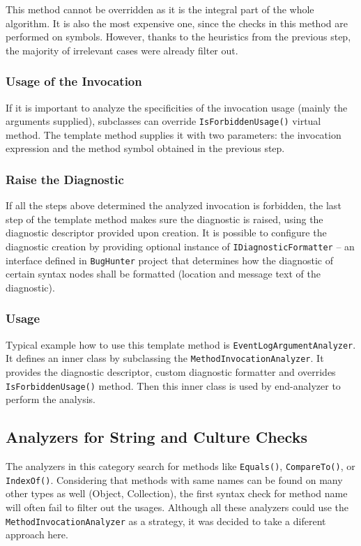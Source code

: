 \documentclass[
  digital, %
  table,   %
  lof,     %
  lot,     %
  oneside,
]{fithesis3}
\begin{document}
This method cannot be overridden as it is the integral part of the whole algorithm. It is also the most expensive one, since the checks in this method are performed on symbols. However, thanks to the heuristics from the previous step, the majority of irrelevant cases were already filter out.

\subsubsection{Usage of the Invocation}
If it is important to analyze the specificities of the invocation usage (mainly the arguments supplied), subclasses can override \texttt{IsForbiddenUsage()} virtual method. The template method supplies it with two parameters: the invocation expression and the method symbol obtained in the previous step.

\subsubsection{Raise the Diagnostic}
If all the steps above determined the analyzed invocation is forbidden, the last step of the template method makes sure the diagnostic is raised, using the diagnostic descriptor provided upon creation. It is possible to configure the diagnostic creation by providing optional instance of \texttt{IDiagnosticFormatter} -- an interface defined in \texttt{BugHunter} project that determines how the diagnostic of certain syntax nodes shall be formatted (location and message text of the diagnostic).

\subsubsection{Usage}
Typical example how to use this template method is \texttt{EventLogArgumentAnalyzer}. It defines an inner class by subclassing the \texttt{MethodInvocationAnalyzer}. It provides the diagnostic descriptor, custom diagnostic formatter and overrides \texttt{IsForbiddenUsage()} method. Then this inner class is used by end-analyzer to perform the analysis.

\subsection{Analyzers for String and Culture Checks}
The analyzers in this category search for methods like \texttt{Equals()}, \texttt{CompareTo()}, or \texttt{IndexOf()}. Considering that methods with same names can be found on many other types as well (Object, Collection), the first syntax check for method name will often fail to filter out the usages. Although all these analyzers could use the \texttt{MethodInvocationAnalyzer} as a strategy, it was decided to take a diferent approach here. 
\end{document}
